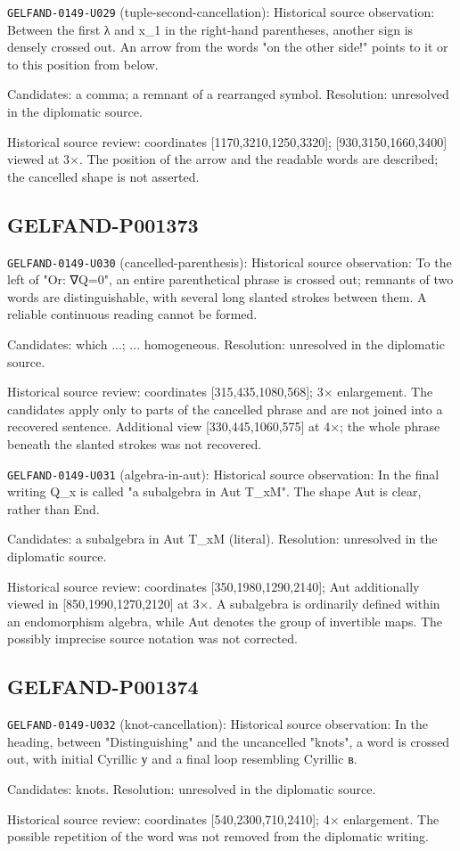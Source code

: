 \noindent\texttt{GELFAND-0149-U029} (tuple-second-cancellation): Historical source observation: Between the first λ and x\_1 in the right-hand parentheses, another sign is densely crossed out. An arrow from the words "on the other side!" points to it or to this position from below.\par
Candidates: a comma; a remnant of a rearranged symbol. Resolution: unresolved in the diplomatic source.\par
Historical source review: coordinates [1170,3210,1250,3320]; [930,3150,1660,3400] viewed at 3×. The position of the arrow and the readable words are described; the cancelled shape is not asserted.\par

\subsection*{GELFAND-P001373}
\noindent\texttt{GELFAND-0149-U030} (cancelled-parenthesis): Historical source observation: To the left of "Or: ∇Q=0", an entire parenthetical phrase is crossed out; remnants of two words are distinguishable, with several long slanted strokes between them. A reliable continuous reading cannot be formed.\par
Candidates: which ...; ... homogeneous. Resolution: unresolved in the diplomatic source.\par
Historical source review: coordinates [315,435,1080,568]; 3× enlargement. The candidates apply only to parts of the cancelled phrase and are not joined into a recovered sentence. Additional view [330,445,1060,575] at 4×; the whole phrase beneath the slanted strokes was not recovered.\par

\noindent\texttt{GELFAND-0149-U031} (algebra-in-aut): Historical source observation: In the final writing Q\_x is called "a subalgebra in Aut T\_xM". The shape Aut is clear, rather than End.\par
Candidates: a subalgebra in Aut T\_xM (literal). Resolution: unresolved in the diplomatic source.\par
Historical source review: coordinates [350,1980,1290,2140]; Aut additionally viewed in [850,1990,1270,2120] at 3×. A subalgebra is ordinarily defined within an endomorphism algebra, while Aut denotes the group of invertible maps. The possibly imprecise source notation was not corrected.\par

\subsection*{GELFAND-P001374}
\noindent\texttt{GELFAND-0149-U032} (knot-cancellation): Historical source observation: In the heading, between "Distinguishing" and the uncancelled "knots", a word is crossed out, with initial Cyrillic у and a final loop resembling Cyrillic в.\par
Candidates: knots. Resolution: unresolved in the diplomatic source.\par
Historical source review: coordinates [540,2300,710,2410]; 4× enlargement. The possible repetition of the word was not removed from the diplomatic writing.\par

